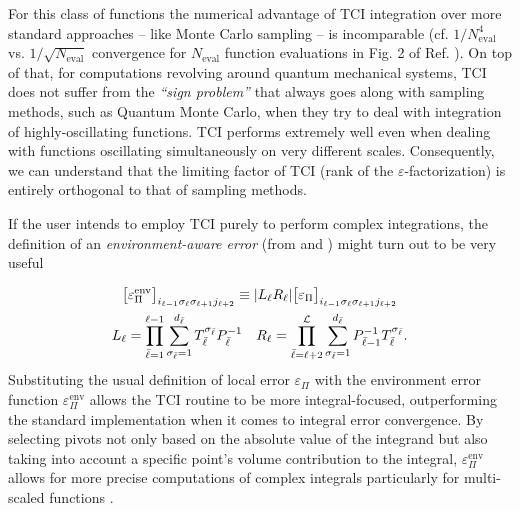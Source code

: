 For this class of functions the numerical advantage of TCI integration over more standard approaches -- like Monte Carlo sampling -- is incomparable (cf. $1/N_{\text{eval}}^4$ vs. $1/\sqrt{N_{\text{eval}}}$ convergence for $N_{\text{eval}}$ function evaluations in Fig. 2 of Ref. \cite{Fernandez2024}). On top of that, for computations revolving around quantum mechanical systems, TCI does not suffer from the \textit{``sign problem''} that always goes along with sampling methods, such as Quantum Monte Carlo, when they try to deal with integration of highly-oscillating functions. TCI performs extremely well even when dealing with functions oscillating simultaneously on very different scales. Consequently, we can understand that the limiting factor of TCI (rank of the $\varepsilon$-factorization) is entirely orthogonal
to that of sampling methods.

If the user intends to employ TCI purely to perform complex integrations, the definition of an \textit{environment-aware error} (from  and ) might turn out to be very useful

\begin{gather}
	\nonumber\bigl[\varepsilon^{\text{env}}_\Pi\bigr]_{i_{\ell-1}\sigma_\ell \sigma_{\ell +1} j_{\ell +2 }}\equiv |L_\ell R_\ell| \bigl[\varepsilon_\Pi\bigr]_{i_{\ell-1}\sigma_\ell \sigma_{\ell +1} j_{\ell +2 }} \\
	L_\ell = \prod_{\bar{\ell}=1}^{\ell -1} \sum^{d_{\bar{\ell}}}_{\sigma_{\bar{\ell}} = 1} T^{\sigma_{\bar{\ell}}}_{\bar{\ell}} P^{-1}_{\bar{\ell}} \quad R_\ell = \prod_{\bar{\ell}=\ell +2}^{\mathcal{L}} \sum^{d_{\bar{\ell}}}_{\sigma_{\bar{\ell}} = 1}  P^{-1}_{\bar{\ell}-1}T^{\sigma_{\bar{\ell}}}_{\bar{\ell}}.
	\label{eq:envError}
\end{gather}
Substituting the usual definition of local  error $\varepsilon_\Pi$ with the environment error function $\varepsilon^{\text{env}}_\Pi$ allows the TCI routine to be more integral-focused, outperforming the standard implementation when it comes to integral error convergence. By selecting pivots not only based on the absolute value of the integrand but also taking into account a specific point's volume contribution to the integral,  $\varepsilon^{\text{env}}_\Pi$ allows for more precise computations of complex integrals particularly for multi-scaled functions \cite{Fernandez2022}.   

